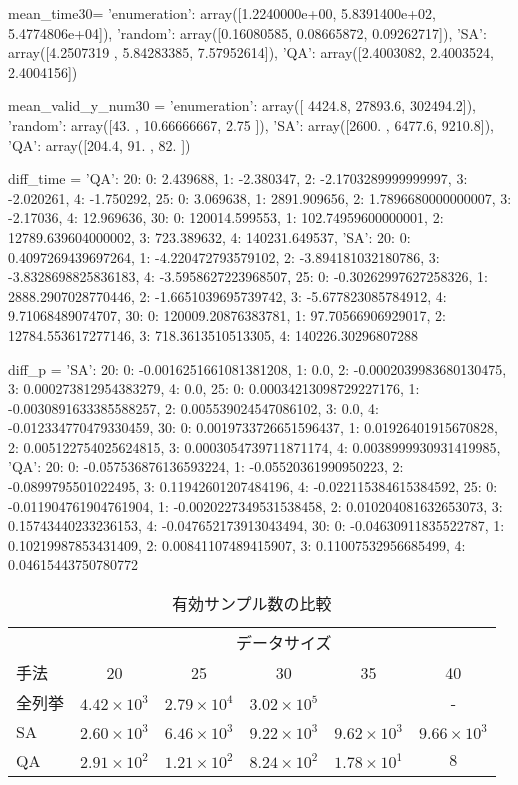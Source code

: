 mean_time30= 
{'enumeration': array([1.2240000e+00, 5.8391400e+02, 5.4774806e+04]),
	'random': array([0.16080585, 0.08665872, 0.09262717]),
	'SA': array([4.2507319 , 5.84283385, 7.57952614]),
	'QA': array([2.4003082, 2.4003524, 2.4004156])}

mean_valid_y_num30 = 
{'enumeration': array([  4424.8,  27893.6, 302494.2]),
	'random': array([43.        , 10.66666667,  2.75      ]),
	'SA': array([2600. , 6477.6, 9210.8]),
	'QA': array([204.4,  91. ,  82. ])}

diff_time =
{'QA': {20: {0: 2.439688,
			1: -2.380347,
			2: -2.1703289999999997,
			3: -2.020261,
			4: -1.750292},
		25: {0: 3.069638,
			1: 2891.909656,
			2: 1.7896680000000007,
			3: -2.17036,
			4: 12.969636},
		30: {0: 120014.599553,
			1: 102.74959600000001,
			2: 12789.639604000002,
			3: 723.389632,
			4: 140231.649537}},
	'SA': {20: {0: 0.4097269439697264,
			1: -4.220472793579102,
			2: -3.894181032180786,
			3: -3.8328698825836183,
			4: -3.5958627223968507},
		25: {0: -0.30262997627258326,
			1: 2888.2907028770446,
			2: -1.6651039695739742,
			3: -5.677823085784912,
			4: 9.71068489074707},
		30: {0: 120009.20876383781,
			1: 97.70566906929017,
			2: 12784.553617277146,
			3: 718.3613510513305,
			4: 140226.30296807288}}}
		
diff_p = 
{'SA': {20: {0: -0.0016251661081381208,
			1: 0.0,
			2: -0.0002039983680130475,
			3: 0.000273812954383279,
			4: 0.0},
		25: {0: 0.00034213098729227176,
			1: -0.0030891633385588257,
			2: 0.005539024547086102,
			3: 0.0,
			4: -0.012334770479330459},
		30: {0: 0.0019733726651596437,
			1: 0.01926401915670828,
			2: 0.005122754025624815,
			3: 0.0003054739711871174,
			4: 0.0038999930931419985}},
	'QA': {20: {0: -0.057536876136593224,
			1: -0.05520361990950223,
			2: -0.0899795501022495,
			3: 0.11942601207484196,
			4: -0.022115384615384592},
		25: {0: -0.011904761904761904,
			1: -0.0020227349531538458,
			2: 0.010204081632653073,
			3: 0.15743440233236153,
			4: -0.047652173913043494},
		30: {0: -0.04630911835522787,
			1: 0.10219987853431409,
			2: 0.00841107489415907,
			3: 0.11007532956685499,
			4: 0.04615443750780772}}}


\begin{table}[hbtp]
	\caption{有効サンプル数の比較}
	\label{tb:sample_num}
	\centering
	\begin{tabular}{lccccc}
		\hline
		&\multicolumn{5}{c}{データサイズ} \\
		手法& 20 & 25 & 30 & 35 & 40 \\
		\hline\hline
		全列挙 & $4.42\times 10^{3}$ & $2.79\times 10^{4}$ & $3.02\times 10^{5}$ & & - \\
		SA & $2.60\times 10^{3}$ & $6.46\times 10^{3}$ & $9.22\times 10^{3}$ & $9.62\times 10^{3}$ & $9.66\times 10^{3}$ \\
		QA & $2.91\times 10^{2}$ & $1.21\times 10^{2}$ & $8.24\times 10^{2}$ & $1.78\times 10^{1}$ & $8$ \\
		\hline
	\end{tabular}
\end{table}



